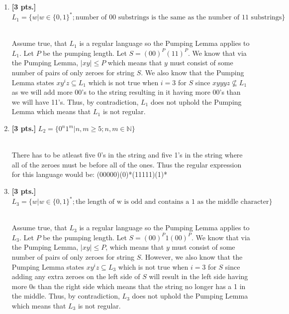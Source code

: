 \documentclass[11pt]{article}
\theoremstyle{definition}
\theoremstyle{theorem}
\newcommand{\solution}{\medskip\noindent{\color{blue}\textbf{Solution:}}}
\begin{document}
\begin{enumerate}[label=(\alph*)]



\item \textbf{[3 pts.]}  $L_1 = \{w |  w\in \{0,1\}^*; \text{number of 00 substrings is the same as the number of 11 substrings}\}$

\solution 
\\ Assume true, that $L_1$ is a regular language so the Pumping Lemma applies to $L_1$. Let $P$ be the pumping length. Let $S = (00)^P(11)^P$. We know that via the Pumping Lemma, $\left\lvert xy \right\rvert \leq P$
which means that $y$ must consist of some number of pairs of only zeroes for string $S$. We also know that the Pumping Lemma states $xy^iz \subseteq L_1$ which is not true when $i = 3$ for $S$ since $xyyyz \nsubseteq L_1$ as we will add more 00's to the string resulting in it having more 00's than we will have 11's. Thus, by contradiction, $L_1$ does not uphold the Pumping Lemma which means that $L_1$ is not regular.

\item \textbf{[3 pts.]}  $L_2 = \{0^n1^m | n,m \geq 5; n,m \in \mathbb{N}\}$

\solution 
\\ There has to be atleast five 0's in the string and five 1's in the string where all of the zeroes must be before all of the ones. Thus the regular expression for this language would be:
(00000)(0)*(11111)(1)*

\item \textbf{[3 pts.]}  $L_3 = \{w |  w\in \{0,1\}^*; \text{the length of w is odd and contains a 1 as the middle character}\}$

\solution 
\\ Assume true, that $L_3$ is a regular language so the Pumping Lemma applies to $L_3$. Let $P$ be the pumping length. Let $S = (00)^P1(00)^P$. We know that via the Pumping Lemma, $\left\lvert xy \right\rvert \leq P$, which means that $y$ must consist of some number of pairs of only zeroes for string $S$. However, we also know that the Pumping Lemma states $xy^iz \subseteq L_3$ which is not true when $i = 3$ for $S$ since adding any extra zeroes on the left side of $S$ will result in the left side having more 0s than the right side which means that the string no longer has a 1 in the middle. Thus, by contradiction, $L_3$ does not uphold the Pumping Lemma which means that $L_3$ is not regular.

\end{enumerate}
\end{document}

